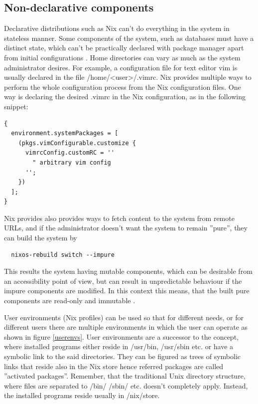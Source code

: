\subsection{Non-declarative components} \label{nondeclarative}

Declarative distributions such as Nix can't do everything in the
system in stateless manner. Some components of the system, such as
databases must have a distinct state, which can't be practically
declared with package manager apart from initial configurations
\cite{van2013reference}. Home directories can vary as much as the
system administrator desires. For example, a configuration file for
text editor vim is usually declared in the file
/home/<user>/.vimrc. Nix provides multiple ways to perform the whole
configuration process from the Nix configuration files. One way is
declaring the desired .vimrc in the Nix configuration, as in the
following snippet:

\begin{lstlisting}
{
  environment.systemPackages = [
    (pkgs.vimConfigurable.customize {
      vimrcConfig.customRC = ''
        " arbitrary vim config
      '';
    })
  ];
}
\end{lstlisting}
Nix provides also provides ways to fetch content to the system from
remote URLs, and if the administrator doesn't want the system to
remain ''pure'', they can build the system by \begin{lstlisting}
  nixos-rebuild switch --impure
\end{lstlisting}
This results the system having mutable components, which can be
desirable from an accessibility point of view, but can result in
unpredictable behaviour if the impure components are modified. In this
context this means, that the built pure components are read-only and
immutable \cite{dolstra2010nixos}.

User environments (Nix profiles) can be used so that for different
needs, or for different users there are multiple environments in which
the user can operate as shown in figure \ref{userenvs}. User
environments are a successor to the concept, where installed programs
either reside in /usr/bin, /usr/sbin etc. or have a symbolic link to
the said directories. They can be figured as trees of symbolic links
that reside also in the Nix store hence referred packages are called
''activated packages''. Remember, that the traditional Unix directory
structure, where files are separated to /bin/ /sbin/ etc. doesn't
completely apply. Instead, the installed programs reside usually in
/nix/store. \cite{dolstra2008nixos}

